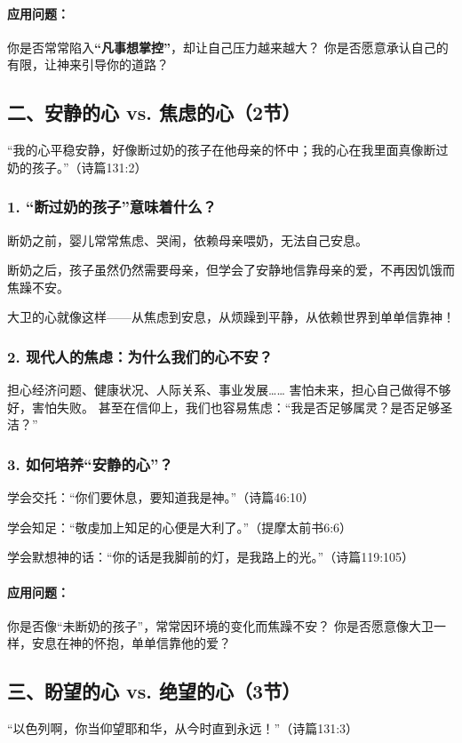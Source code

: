 \documentclass[a4paper, 12pt]{article}
\begin{document}
\paragraph*{应用问题：}

你是否常常陷入\textbf{“凡事想掌控”}，却让自己压力越来越大？
你是否愿意承认自己的有限，让神来引导你的道路？
\subsection*{二、安静的心 vs. 焦虑的心（2节）}
“我的心平稳安静，好像断过奶的孩子在他母亲的怀中；我的心在我里面真像断过奶的孩子。”（诗篇131:2）

\subsubsection*{1. “断过奶的孩子”意味着什么？}
\hspace{0.6cm}断奶之前，婴儿常常焦虑、哭闹，依赖母亲喂奶，无法自己安息。

断奶之后，孩子虽然仍然需要母亲，但学会了安静地信靠母亲的爱，不再因饥饿而焦躁不安。

大卫的心就像这样——从焦虑到安息，从烦躁到平静，从依赖世界到单单信靠神！
\subsubsection*{2. 现代人的焦虑：为什么我们的心不安？}
担心经济问题、健康状况、人际关系、事业发展……
害怕未来，担心自己做得不够好，害怕失败。
甚至在信仰上，我们也容易焦虑：“我是否足够属灵？是否足够圣洁？”
\subsubsection*{3. 如何培养“安静的心”？}
\hspace{0.6cm}学会交托：“你们要休息，要知道我是神。”（诗篇46:10）

学会知足：“敬虔加上知足的心便是大利了。”（提摩太前书6:6）

学会默想神的话：“你的话是我脚前的灯，是我路上的光。”（诗篇119:105）

\paragraph*{应用问题：}

你是否像“未断奶的孩子”，常常因环境的变化而焦躁不安？
你是否愿意像大卫一样，安息在神的怀抱，单单信靠他的爱？
\subsection*{三、盼望的心 vs. 绝望的心（3节）}
“以色列啊，你当仰望耶和华，从今时直到永远！”（诗篇131:3）
\end{document}
